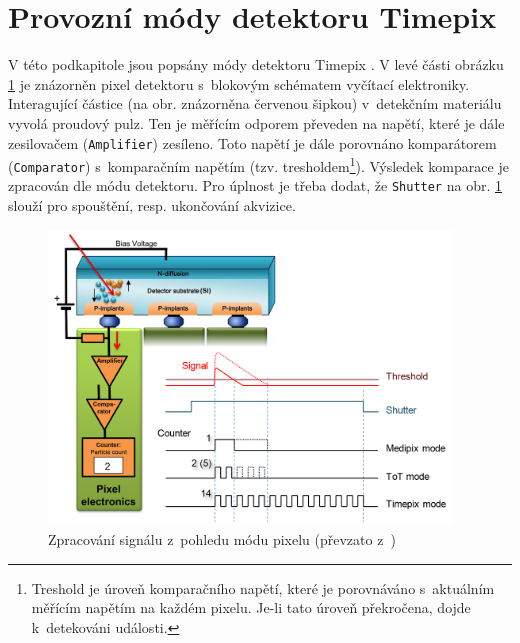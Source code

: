 \section{Provozní módy detektoru Timepix}\label{det:mod}
V této podkapitole jsou popsány módy detektoru Timepix \cite{timepix}. 
V levé části obrázku \ref{fig:det:signal_proc} je znázorněn pixel detektoru s~blokovým schématem vyčítací elektroniky. Interagující částice (na obr. znázorněna červenou šipkou) v~detekčním materiálu vyvolá proudový pulz. Ten je měřícím odporem převeden na napětí, které je dále zesilovačem (\texttt{Amplifier}) zesíleno. Toto napětí je dále porovnáno komparátorem (\texttt{Comparator}) s~komparačním napětím (tzv. tresholdem\footnote{Treshold je úroveň komparačního napětí, které je porovnáváno s~aktuálním měřícím napětím na každém pixelu. Je-li tato úroveň překročena, dojde k~detekováni události.}). 
Výsledek komparace je zpracován dle módu detektoru. Pro úplnost je třeba dodat, že \texttt{Shutter} na obr. \ref{fig:det:signal_proc} slouží pro spouštění, resp. ukončování akvizice.

\begin{figure}[th!]
	\begin{center}
		\includegraphics[width=10.75cm]{figures/det_pix.png}
		\caption{Zpracování signálu z~pohledu módu pixelu (převzato z~\cite{PlatkevicDisertace})}
		\label{fig:det:signal_proc}
	\end{center}
\end{figure}


